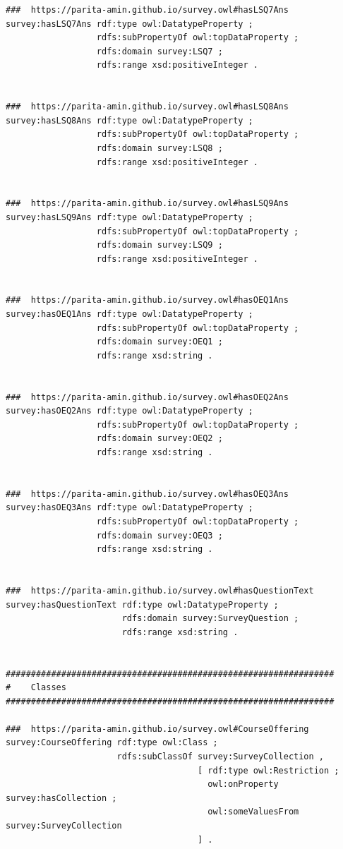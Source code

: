 \begin{lstlisting}
###  https://parita-amin.github.io/survey.owl#hasLSQ7Ans
survey:hasLSQ7Ans rdf:type owl:DatatypeProperty ;
                  rdfs:subPropertyOf owl:topDataProperty ;
                  rdfs:domain survey:LSQ7 ;
                  rdfs:range xsd:positiveInteger .


###  https://parita-amin.github.io/survey.owl#hasLSQ8Ans
survey:hasLSQ8Ans rdf:type owl:DatatypeProperty ;
                  rdfs:subPropertyOf owl:topDataProperty ;
                  rdfs:domain survey:LSQ8 ;
                  rdfs:range xsd:positiveInteger .


###  https://parita-amin.github.io/survey.owl#hasLSQ9Ans
survey:hasLSQ9Ans rdf:type owl:DatatypeProperty ;
                  rdfs:subPropertyOf owl:topDataProperty ;
                  rdfs:domain survey:LSQ9 ;
                  rdfs:range xsd:positiveInteger .


###  https://parita-amin.github.io/survey.owl#hasOEQ1Ans
survey:hasOEQ1Ans rdf:type owl:DatatypeProperty ;
                  rdfs:subPropertyOf owl:topDataProperty ;
                  rdfs:domain survey:OEQ1 ;
                  rdfs:range xsd:string .


###  https://parita-amin.github.io/survey.owl#hasOEQ2Ans
survey:hasOEQ2Ans rdf:type owl:DatatypeProperty ;
                  rdfs:subPropertyOf owl:topDataProperty ;
                  rdfs:domain survey:OEQ2 ;
                  rdfs:range xsd:string .


###  https://parita-amin.github.io/survey.owl#hasOEQ3Ans
survey:hasOEQ3Ans rdf:type owl:DatatypeProperty ;
                  rdfs:subPropertyOf owl:topDataProperty ;
                  rdfs:domain survey:OEQ3 ;
                  rdfs:range xsd:string .


###  https://parita-amin.github.io/survey.owl#hasQuestionText
survey:hasQuestionText rdf:type owl:DatatypeProperty ;
                       rdfs:domain survey:SurveyQuestion ;
                       rdfs:range xsd:string .


#################################################################
#    Classes
#################################################################

###  https://parita-amin.github.io/survey.owl#CourseOffering
survey:CourseOffering rdf:type owl:Class ;
                      rdfs:subClassOf survey:SurveyCollection ,
                                      [ rdf:type owl:Restriction ;
                                        owl:onProperty survey:hasCollection ;
                                        owl:someValuesFrom survey:SurveyCollection
                                      ] .



\end{lstlisting}
